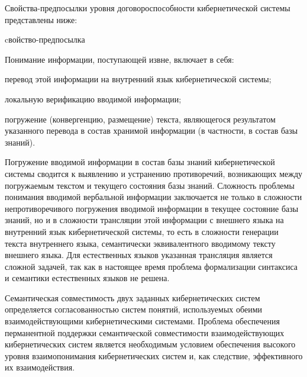 Свойства-предпосылки уровня договороспособности кибернетической системы представлены ниже:

\begin{SCn}
\begin{scnrelfromlist}{cвойство-предпосылка}
\end{scnrelfromlist}
\end{SCn}

Понимание информации, поступающей извне, включает в себя:
\begin{textitemize}
    \item перевод этой информации на внутренний язык кибернетической системы;
    \item локальную верификацию вводимой информации;
    \item погружение (конвергенцию, размещение) текста, являющегося результатом указанного перевода в состав хранимой информации (в частности, в состав базы знаний).
\end{textitemize}

Погружение вводимой информации в состав базы знаний кибернетической системы сводится к выявлению и устранению противоречий, возникающих между погружаемым текстом и текущего состояния базы знаний.
Сложность проблемы понимания вводимой вербальной информации заключается не только в сложности непротиворечивого погружения вводимой информации в текущее состояние базы знаний, но и в сложности трансляции этой информации с внешнего языка на внутренний язык кибернетической системы, то есть в сложности генерации текста внутреннего языка, семантически эквивалентного вводимому тексту внешнего языка.
Для естественных языков указанная трансляция является сложной задачей, так как в настоящее время проблема формализации синтаксиса и семантики естественных языков не решена.

Семантическая совместимость двух заданных кибернетических систем определяется согласованностью систем понятий, используемых обеими взаимодействующими кибернетическими системами.
Проблема обеспечения перманентной поддержки семантической совместимости взаимодействующих кибернетических систем является необходимым условием обеспечения высокого уровня взаимопонимания кибернетических систем и, как следствие, эффективного их взаимодействия.

